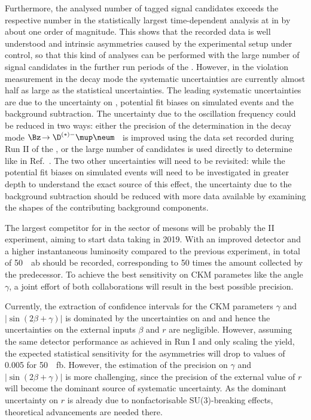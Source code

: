 Furthermore, the analysed number of tagged signal candidates exceeds the respective number in the statistically largest time-dependent \CP analysis at \lhcb in \BdToJPsiKS by about one order of magnitude.
This shows that the recorded data is well understood and intrinsic asymmetries caused \eg by the experimental setup under control, so that this kind of analyses can be performed with the large number of signal candidates in the further run periods of the \lhc.
However, in the \CP violation measurement in the decay mode \BdToDpi the systematic uncertainties are currently almost half as large as the statistical uncertainties.
The leading systematic uncertainties are due to the uncertainty on \dm, potential fit biases on simulated events and the background subtraction.
The uncertainty due to the \Bz oscillation frequency could be reduced in two ways: either the precision of the determination in the decay mode $\Bz\!\to\D^{(*)-}\mup\neum$~\cite{Aaij:2016fdk} is improved using the data set recorded during Run II of the \lhc, or the large number of \BdToDpi candidates is used directly to determine \dm like in Ref.~\cite{Aaij:2012nt}.
The two other uncertainties will need to be revisited: while the potential fit biases on simulated events will need to be investigated in greater depth to understand the exact source of this effect, the uncertainty due to the background subtraction should be reduced with more data available by examining the shapes of the contributing background components.

The largest competitor for \lhcb in the sector of \B mesons will be probably the \belle II experiment, aiming to start data taking in \num{2019}.
With an improved detector and a higher instantaneous luminosity compared to the previous \belle experiment, in total of \SI{50}{\per\atto\barn} should be recorded, corresponding to \num{50} times the amount collected by the predecessor.
To achieve the best sensitivity on CKM parametes like the angle $\gamma$, a joint effort of both collaborations will result in the best possible precision.

Currently, the extraction of confidence intervals for the CKM parameters $\gamma$ and $\left|\sin\!\left(2\beta+\gamma\right)\right|$ is dominated by the uncertainties on \Sf and \Sfbar and hence the uncertainties on the external inputs $\beta$ and $r$ are negligible.
However, assuming the same detector performance as achieved in Run I and only scaling the \BdToDpi yield, the expected statistical sensitivity for the \CP asymmetries will drop to values of \eg \num{0.005} for \SI{50}{\per\femto\barn}.
However, the estimation of the precision on $\gamma$ and $\left|\sin\!\left(2\beta+\gamma\right)\right|$ is more challenging, since the precision of the external value of $r$ will become the dominant source of systematic uncertainty. As the dominant uncertainty on $r$ is already due to nonfactorisable SU(3)-breaking effects, theoretical advancements are needed there.
